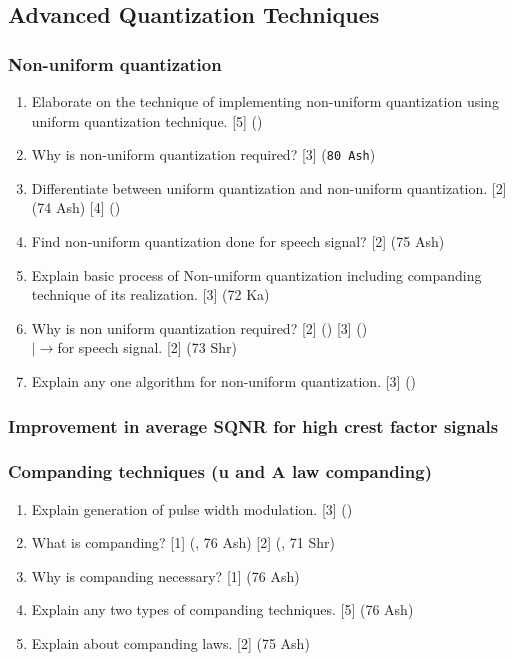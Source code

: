 \documentclass[12pt]{article}
\newcommand{\lb}{\\$\left|\rightarrow\right.$}
\begin{document}
  \subsection{Advanced Quantization Techniques}
    \subsubsection{Non-uniform quantization}
    	\begin{enumerate}
    		\item Elaborate on the technique of implementing non-uniform quantization using uniform quantization technique. \hfill [5] ()

        \item Why is non-uniform quantization required? \hfill [3] (\texttt{80 Ash})
    		
    		\item Differentiate between uniform quantization and non-uniform quantization. \hfill [2] (74 Ash) [4] ()
    		
    		\item Find non-uniform quantization done for speech signal? \hfill [2] (75 Ash)
    		
    		\item Explain basic process of Non-uniform quantization including companding technique of its realization. \hfill [3] (72 Ka)
    		
    		\item Why is non uniform quantization required? \hfill [2] () [3] ()
    		\lb for speech signal. \hfill [2] (73 Shr)
    		
    		\item Explain any one algorithm for non-uniform quantization. \hfill [3] ()
    	\end{enumerate}
    
    \subsubsection{Improvement in average SQNR for high crest factor signals}
    \subsubsection{Companding techniques (u and A law companding)}
    	\begin{enumerate}
    		\item Explain generation of pulse width modulation. \hfill [3] ()
    		
    		\item What is companding? \hfill [1] (, 76 Ash) [2] (, 71 Shr)

        	\item Why is companding necessary? \hfill [1] (76 Ash)

        	\item Explain any two types of companding techniques. \hfill [5] (76 Ash)
        	
        	\item Explain about companding laws. \hfill [2] (75 Ash)
    	\end{enumerate}
    
\end{document}
